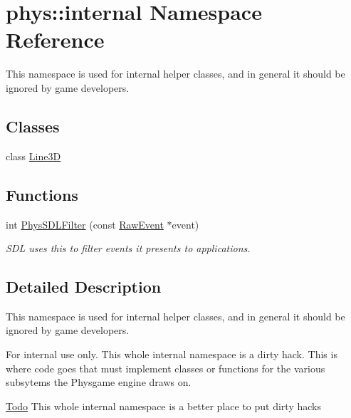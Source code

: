 \hypertarget{namespacephys_1_1internal}{
\section{phys::internal Namespace Reference}
\label{d0/d26/namespacephys_1_1internal}
}


This namespace is used for internal helper classes, and in general it should be ignored by game developers.  


\subsection*{Classes}
\begin{DoxyCompactItemize}
\item 
class \hyperlink{classphys_1_1internal_1_1Line3D}{Line3D}
\end{DoxyCompactItemize}
\subsection*{Functions}
\begin{DoxyCompactItemize}
\item 
int \hyperlink{namespacephys_1_1internal_aae2a1133a05c67ac3062038c0c5dad4a}{PhysSDLFilter} (const \hyperlink{namespacephys_a8126d26e4507e66d09876988bb941fd4}{RawEvent} $\ast$event)
\begin{DoxyCompactList}\small\item\em SDL uses this to filter events it presents to applications. \item\end{DoxyCompactList}\end{DoxyCompactItemize}


\subsection{Detailed Description}
This namespace is used for internal helper classes, and in general it should be ignored by game developers. \begin{DoxyInternal}{For internal use only.}
This whole internal namespace is a dirty hack. This is where code goes that must implement classes or functions for the various subsytems the Physgame engine draws on.

\begin{Desc}
\item[\hyperlink{todo__todo000008}{Todo}]This whole internal namespace is a better place to put dirty hacks \end{Desc}
\end{DoxyInternal}


